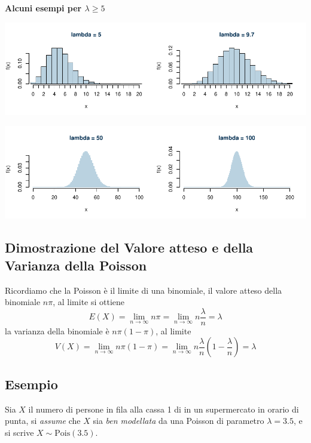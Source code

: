 \documentclass[
  11pt,
]{book}
\theoremstyle{mytheoremstyle}
\theoremstyle{mydefstyle}
\begin{document}
\textbf{Alcuni esempi per \(\lambda\geq 5\)}

\begin{center}\includegraphics{Appunti_di_Statistica_2025_files/figure-latex/07b-Poisson-3,-1} \end{center}

\begin{center}\includegraphics{Appunti_di_Statistica_2025_files/figure-latex/07b-Poisson-4,-1} \end{center}

\subsection{Dimostrazione del Valore atteso e della Varianza della Poisson}\label{dimostrazione-del-valore-atteso-e-della-varianza-della-poisson}

Ricordiamo che la Poisson è il limite di una binomiale, il valore atteso della binomiale \(n\pi\), al limite si ottiene
\[E(X)=\lim_{n\to\infty} n\pi=\lim_{n\to\infty} n\frac\lambda n=\lambda\]
la varianza della binomiale è \(n\pi(1-\pi)\), al limite
\[V(X)=\lim_{n\to\infty}n\pi(1-\pi)=\lim_{n\to\infty}n\frac\lambda n\left(1-\frac\lambda n\right)=\lambda\]

\subsection{Esempio}\label{esempio-1}

Sia \(X\) il numero di persone in fila alla cassa 1 di in un supermercato in orario di punta, si \emph{assume} che \(X\) sia \emph{ben modellata} da una Poisson di parametro \(\lambda=3.5\), e si scrive \(X\sim\text{Pois}(3.5)\).
\end{document}
